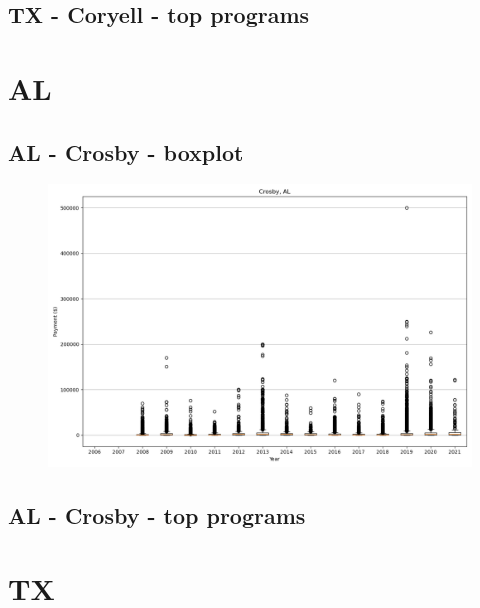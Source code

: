 \subsection*{TX - Coryell - top programs}

\newpage
\section*{AL}
\subsection*{AL - Crosby - boxplot}
\begin{figure}[h]
\centering
\includegraphics[width=7in]{../output/boxplots/counties/Crosby-AL_boxplot.png}
\end{figure}


\subsection*{AL - Crosby - top programs}

\newpage
\section*{TX}

